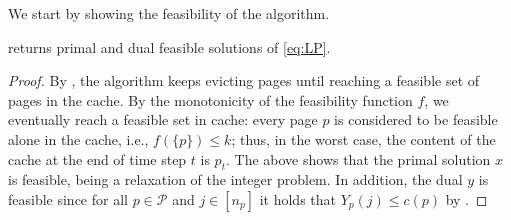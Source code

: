 \documentclass[11pt]{article}
\newcommand{\cP}{{\mathcal{P}}}
\newcommand{\cS}{{\mathcal{S}}}
\begin{document}
We start by showing the feasibility of the algorithm. 

	\begin{lemma}
	\label{lem:feasibilityD}
	 returns primal and dual feasible solutions of \eqref{eq:LP}.  
\end{lemma}

\begin{proof}
	By , the algorithm keeps evicting pages until reaching a feasible set of pages in the cache. By the monotonicity of the feasibility function $f$, we eventually reach a feasible set in cache: every page $p$ is considered to be feasible alone in the cache, i.e., $f(\{p\}) \leq k$; thus, in the worst case, the content of the cache at the end of time step $t$ is $p_t$. The above shows that the primal solution $x$ is feasible, being a relaxation of the integer problem.
	In addition, the dual $y$ is feasible since for all $p \in \cP$ and $j \in [n_p]$ it holds that $Y_p(j) \leq c(p)$ by . 
%		
%	
%	
\end{proof}
\end{document}
